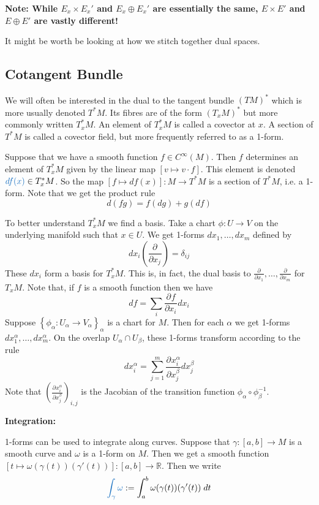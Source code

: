 \documentclass[11pt]{article}
\newcommand{\defeq}{:=}
\newcommand{\R}{\mathbb{R}}
\newcommand*{\pd}[3][]{\ensuremath{\frac{\partial^{#1} {#2}}{\partial {#3}^{#1}}}}
\newenvironment{defin}
	{\begin{mdframed}[backgroundcolor=white, roundcorner=5pt, linewidth=1pt, linecolor=RoyalBlue]
		\setlength{\parindent}{0pt}}
	{\end{mdframed}}
\newcommand{\mdf}[1]{{\color{RoyalBlue} #1}}
\newenvironment{note}
	{\begin{mdframed}[backgroundcolor=white, linecolor=RubineRed, roundcorner=5pt, linewidth=1pt]\bfseries{Note:}\normalfont
	\setlength{\parindent}{0pt}}
	{\end{mdframed}}
\begin{document}
\begin{note}
While $E_x\times E_x'$ and $E_x \oplus E_x'$ are essentially the same, $E\times E'$ and $E\oplus E'$ are vastly different!
\end{note}

It might be worth be looking at how we stitch together dual spaces.

\subsection{Cotangent Bundle}
\begin{defin}
We will often be interested in the dual to the tangent bundle $(TM)^\ast$ which is more usually denoted $T^\ast M$.
Its fibres are of the form $(T_xM)^\ast$ but more commonly written $T_x^\ast M$.
An element of $T_x^\ast M$ is called a \mdf{covector} at $x$.
A section of $T^\ast M$ is called a \mdf{covector field}, but more frequently referred to as a \mdf{1-form}.
\end{defin}

Suppose that we have a smooth function $f\in C^\infty(M)$.
Then $f$ determines an element of $T_x^\ast M$ given by the linear map $[v \mapsto v \cdot f]$.
This element is denoted $\mdf{df(x)}\in T_x^\ast M$.
So the map $[f\mapsto df(x)]:M\to T^\ast M$ is a section of $T^\ast M$, i.e. a 1-form.
Note that we get the product rule
\[
	d(fg) = f(dg) + g(df)
\]

To better understand $T_x^\ast M$ we find a basis.
Take a chart $\phi:U \to V$ on the underlying manifold such that $x\in U$.
We get 1-forms $dx_1, \dots , dx_m$ defined by
\[
	dx_i \left(\pd{}{x_j}\right)=\delta_{ij}
\]
These $dx_i$ form a basis for $T_x^\ast M$.
This is, in fact, the dual basis to $\pd{}{x_1}, \dots, \pd{}{x_m}$ for $T_xM$.
Note that, if $f$ is a smooth function then we have
\[
	df = \sum_{i}\pd{f}{x_i}dx_i
\]
Suppose $\left\{ \phi_\alpha: U_\alpha \to V_\alpha\right\}_\alpha$ is a chart for $M$.
Then for each $\alpha$ we get 1-forms $dx_1^\alpha, \dots, dx_m^\alpha$.
On the overlap $U_\alpha \cap U_\beta$, these 1-forms transform according to the rule
\[
	dx_i^\alpha = \sum_{j=1}^m \pd{x_i^\alpha}{x_j^\beta}dx_j^\beta
\]
Note that $\left( \pd{x_i^\alpha}{x_j^\beta}\right)_{i, j}$ is the Jacobian of the transition function $\phi_\alpha \circ \phi_\beta^{-1}$.

\noindent\textbf{Integration: }

1-forms can be used to integrate along curves.
Suppose that $\gamma:[a, b] \to M$ is a smooth curve and $\omega$ is a 1-form on $M$.
Then we get a smooth function $[t \mapsto \omega(\gamma(t))(\gamma'(t))]:[a, b] \to \R$.
Then we write
\[
	\mdf{\int_\gamma \omega}\defeq\int_a^b \omega(\gamma(t))(\gamma'(t))\; dt
\]
\end{document}
